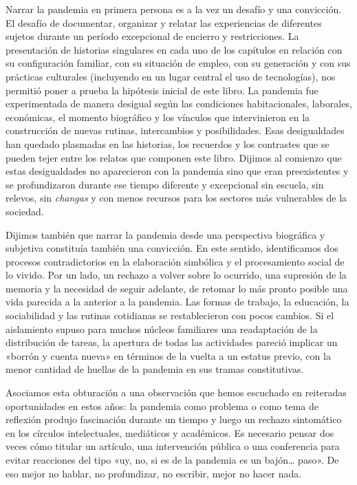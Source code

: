 
\label{cap-22}

Narrar la pandemia en primera persona es a la vez un desafío y una convicción. El desafío de documentar, organizar y relatar las experiencias de diferentes sujetos durante un período excepcional de encierro y restricciones. La presentación de historias singulares en cada uno de los capítulos en relación con su configuración familiar, con su situación de empleo, con su generación y con sus prácticas culturales (incluyendo en un lugar central el uso de tecnologías), nos permitió poner a prueba la hipótesis inicial de este libro. La pandemia fue experimentada de manera desigual según las condiciones habitacionales, laborales, económicas, el momento biográfico y los vínculos que intervinieron en la construcción de nuevas rutinas, intercambios y posibilidades. Esas desigualdades han quedado plasmadas en las historias, los recuerdos y los contrastes que se pueden tejer entre los relatos que componen este libro. Dijimos al comienzo que estas desigualdades no aparecieron con la pandemia sino que eran preexistentes y se profundizaron durante ese tiempo diferente y excepcional sin escuela, sin relevos, sin \emph{changas} y con menos recursos para los sectores más vulnerables de la sociedad.

Dijimos también que narrar la pandemia desde una perspectiva biográfica y subjetiva constituía también una convicción. En este sentido, identificamos dos procesos contradictorios en la elaboración simbólica y el procesamiento social de lo vivido. Por un lado, un rechazo a volver sobre lo ocurrido, una supresión de la memoria y la necesidad de seguir adelante, de retomar lo más pronto posible una vida parecida a la anterior a la pandemia. Las formas de trabajo, la educación, la sociabilidad y las rutinas cotidianas se restablecieron con pocos cambios. Si el aislamiento supuso para muchos núcleos familiares una readaptación de la distribución de tareas, la apertura de todas las actividades pareció implicar un «borrón y cuenta nueva» en términos de la vuelta a un estatus previo, con la menor cantidad de huellas de la pandemia en sus tramas constitutivas.

Asociamos esta obturación a una observación que hemos escuchado en reiteradas oportunidades en estos años: la pandemia como problema o como tema de reflexión produjo fascinación durante un tiempo y luego un rechazo sintomático en los círculos intelectuales, mediáticos y académicos. Es necesario pensar dos veces cómo titular un artículo, una intervención pública o una conferencia para evitar reacciones del tipo «uy, no, si es de la pandemia es un bajón… paso». De eso mejor no hablar, no profundizar, no escribir, mejor no hacer nada.


